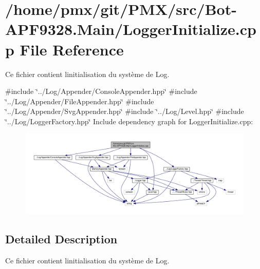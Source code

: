 \hypertarget{Bot-APF9328_8Main_2LoggerInitialize_8cpp}{}\section{/home/pmx/git/\+P\+M\+X/src/\+Bot-\/\+A\+P\+F9328.Main/\+Logger\+Initialize.cpp File Reference}
\label{Bot-APF9328_8Main_2LoggerInitialize_8cpp}


Ce fichier contient l\textquotesingle{}initialisation du système de Log.  


{\ttfamily \#include \char`\"{}../\+Log/\+Appender/\+Console\+Appender.\+hpp\char`\"{}}\newline
{\ttfamily \#include \char`\"{}../\+Log/\+Appender/\+File\+Appender.\+hpp\char`\"{}}\newline
{\ttfamily \#include \char`\"{}../\+Log/\+Appender/\+Svg\+Appender.\+hpp\char`\"{}}\newline
{\ttfamily \#include \char`\"{}../\+Log/\+Level.\+hpp\char`\"{}}\newline
{\ttfamily \#include \char`\"{}../\+Log/\+Logger\+Factory.\+hpp\char`\"{}}\newline
Include dependency graph for Logger\+Initialize.\+cpp\+:
\nopagebreak
\begin{figure}[H]
\begin{center}
\leavevmode
\includegraphics[width=350pt]{Bot-APF9328_8Main_2LoggerInitialize_8cpp__incl}
\end{center}
\end{figure}


\subsection{Detailed Description}
Ce fichier contient l\textquotesingle{}initialisation du système de Log. 

